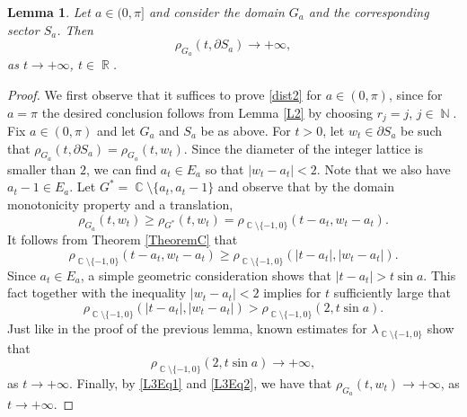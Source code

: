 \documentclass[11pt, letterpaper,leqno]{amsart}
\numberwithin{equation}{section}
\newtheorem{lemma}{Lemma}[section]
\theoremstyle{definition}
\DeclareMathOperator{\N}{\mathbb{N}}
\DeclareMathOperator{\C}{\mathbb{C}}
\DeclareMathOperator{\R}{\mathbb{R}}
\begin{document}
\begin{lemma}\label{L3}
	Let $a\in (0,\pi]$ and consider the domain $G_a$ and the corresponding sector $S_a$. Then
	\begin{equation}\label{dist2}
		\rho_{G_a}(t,\partial S_a)\to +\infty,
	\end{equation}
	as $t\to +\infty$, $t\in\R$.
\end{lemma}
\begin{proof}
We first observe that it suffices to prove \eqref{dist2} for $a\in (0,\pi)$, since for $a=\pi$ the desired conclusion follows from Lemma \ref{L2} by choosing $r_j=j$, $j\in\N$. Fix $a\in (0,\pi)$ and let $G_a$ and $S_a$ be as above. For $t>0$, let $w_t\in\partial S_a$ be such that 
$\rho_{G_a}(t,\partial S_a)=\rho_{G_a}(t,w_t)$. Since the diameter of the integer lattice is smaller than $2$, we can find $a_t\in E_a$ so that $|w_t-a_t|<2$. Note that we also have $a_t-1\in E_a$. Let $G^*=\C\setminus\{a_t, a_t-1\}$ and observe that by the domain monotonicity property and a translation,
\begin{equation}\label{L3Eq1}
	\rho_{G_a}(t,w_t)\geq \rho_{G^*}(t,w_t)=\rho_{\C\setminus\{-1,0\}}(t-a_t,w_t-a_t).
\end{equation}
It follows from Theorem \ref{TheoremC} that 
\begin{equation}\label{L3Eq2}
\rho_{\C\setminus\{-1,0\}}(t-a_t,w_t-a_t)\geq \rho_{\C\setminus\{-1,0\}}\left(|t-a_t|,|w_t-a_t|\right).
\end{equation}
Since $a_t\in E_a$, a simple geometric consideration shows that $|t-a_t|>t\sin a$. This fact together with the inequality $|w_t-a_t|<2$ implies for $t$ sufficiently large that
\[
\rho_{\C\setminus\{-1,0\}}\left(|t-a_t|,|w_t-a_t|\right)>\rho_{\C\setminus\{-1,0\}}\left(2,t\sin a\right).
\]
Just like in the proof of the previous lemma, known estimates for $\lambda_{\C\setminus\{-1,0\}}$ show that 
\[
\rho_{\C\setminus\{-1,0\}}\left(2,t\sin a\right)\to +\infty,
\]
as $t\to +\infty$. Finally, by \eqref{L3Eq1} and \eqref{L3Eq2}, we have that $\rho_{G_a}(t,w_t)\to +\infty$, as $t\to +\infty$.
\end{proof}
\end{document}
